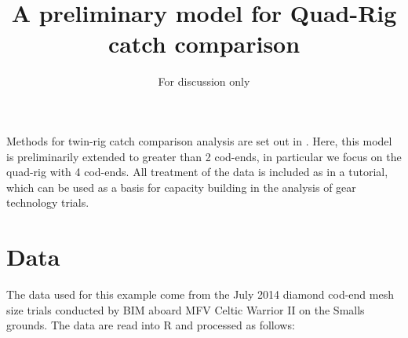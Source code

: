 \documentclass[12pt]{article}\usepackage[]{graphicx}\usepackage[]{color}
\title{A preliminary model for Quad-Rig catch comparison}
\author{For discussion only}
\date{}
\begin{document}
\maketitle
Methods for twin-rig catch comparison analysis are set out in \citet{Holst:Reville:2009}. Here, this model is preliminarily extended to greater than 2 cod-ends, in particular we focus on the quad-rig with 4 cod-ends. All treatment of the data is included as in a tutorial, which can be used as a basis for capacity building in the analysis of gear technology trials.

\section{Data}
The data used for this example come from the July 2014 diamond cod-end mesh size trials conducted by BIM aboard MFV Celtic Warrior II on the Smalls grounds. The data are read into R and processed as follows:
\end{document}
